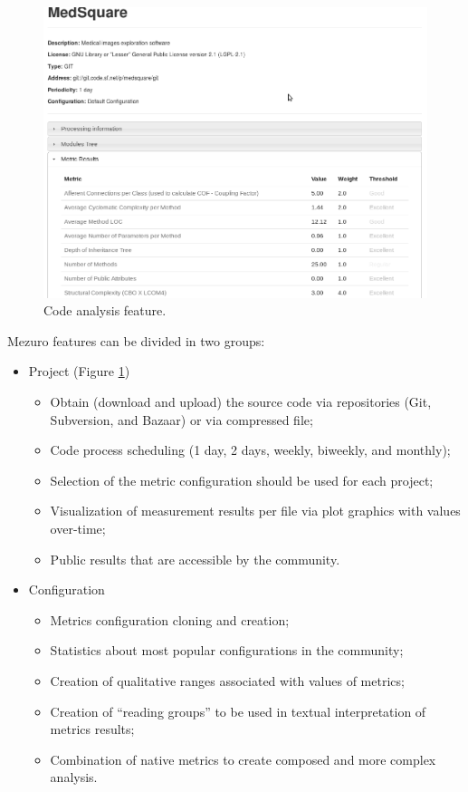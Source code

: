 \begin{figure}[hbt]
  \centering
    \includegraphics[width=.9\linewidth]{images/new-repository-results.png}
  \caption{Code analysis feature.}
  \label{fig:feature-1}
\end{figure}

Mezuro features can be divided in two groups:

\begin{itemize}
    \item Project (Figure \ref{fig:feature-1})

    \begin{itemize}
        \item Obtain (download and upload) the source code via repositories (Git, Subversion, and Bazaar) or via compressed file;
        \item Code process scheduling (1 day, 2 days, weekly, biweekly, and monthly);
        \item Selection of the metric configuration should be used for each project;
        \item Visualization of measurement results per file via plot graphics with values over-time;
        \item Public results that are accessible by the community.
    \end{itemize}
    \item Configuration
    \begin{itemize}
        \item Metrics configuration cloning and creation;
        \item Statistics about most popular configurations in the community;
        \item Creation of qualitative ranges associated with values of metrics;
	\item Creation of ``reading groups'' to be used in textual interpretation of metrics results;
        \item Combination of native metrics to create composed and more complex analysis.
    \end{itemize}
\end{itemize}

